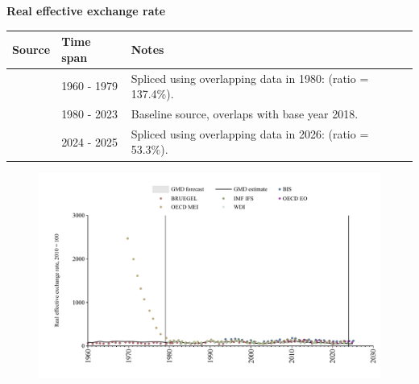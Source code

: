 \documentclass[12pt,a4paper,landscape]{article}
\begin{document}
\begin{adjustbox}{max totalsize={\paperwidth}{\paperheight},center}
\begin{minipage}[t][\textheight][t]{\textwidth}
\vspace*{0.5cm}
{}
\begin{center}
{\Large\bfseries Real effective exchange rate}
\end{center}
\vspace{0.5cm}
\begin{table}[H]
\centering
\small
\begin{tabular}{|l|l|l|}
\hline
\textbf{Source} & \textbf{Time span} & \textbf{Notes} \\
\hline
\rowcolor{white}\cite{BRUEGEL}& 1960 - 1979 &Spliced using overlapping data in 1980: (ratio = 137.4\%). \\
\rowcolor{lightgray}\cite{WDI}& 1980 - 2023 &Baseline source, overlaps with base year 2018. \\
\rowcolor{white}\cite{BIS}& 2024 - 2025 &Spliced using overlapping data in 2026: (ratio = 53.3\%). \\
\hline
\end{tabular}
\end{table}
\begin{figure}[H]
\centering
\includegraphics[width=\textwidth,height=0.6\textheight,keepaspectratio]{graphs/BRA_REER.pdf}
\end{figure}
\end{minipage}
\end{adjustbox}
\end{document}
